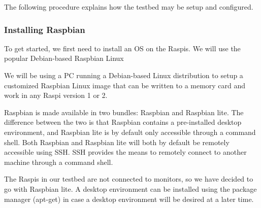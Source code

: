 %






The following procedure explains how the testbed may be setup and configured.



\subsubsection{Installing Raspbian}

To get started, we first need to install an \ac{OS} on the
\ac{Raspi}s. We will use the popular Debian-based Raspbian
Linux~\cite{raspbian}

We will be using a \ac{PC} running a Debian-based Linux distribution
to setup a customized Raspbian Linux image that can be written to
a memory card and work in any \ac{Raspi} version 1 or 2.

Raspbian is made available in two bundles: Raspbian and Raspbian lite.
The difference between the two is that Raspbian contains a pre-installed desktop
environment, and Raspbian lite is by default only accessible through a 
command shell. Both Raspbian and Raspbian lite will both by default be remotely
accessible using \ac{SSH}. \ac{SSH} provides the means to remotely
connect to another machine through a command shell.

The \ac{Raspi}s in our testbed are not connected to monitors, so we
have decided to go with Raspbian lite.
A desktop environment can be installed using the package manager
(apt-get) in case a desktop environment will be desired at a later
time.

